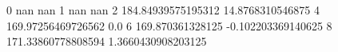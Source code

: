 0 nan nan
1 nan nan
2 184.84939575195312 14.8768310546875
4 169.97256469726562 0.0
6 169.870361328125 -0.102203369140625
8 171.33860778808594 1.3660430908203125
